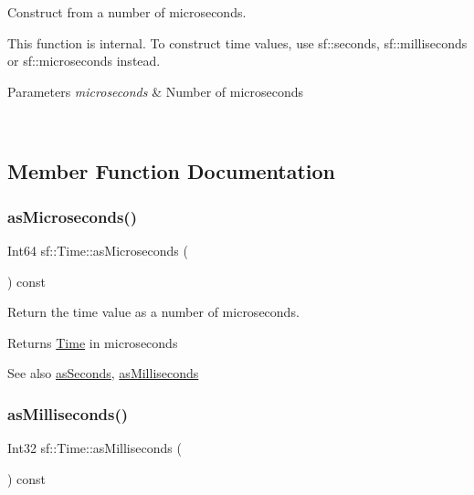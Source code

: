 Construct from a number of microseconds. 

This function is internal. To construct time values, use sf\+::seconds, sf\+::milliseconds or sf\+::microseconds instead.


\begin{DoxyParams}{Parameters}
{\em microseconds} & Number of microseconds \begin{DoxyVerb}\end{DoxyVerb}
 \\
\hline
\end{DoxyParams}


\subsection{Member Function Documentation}
\mbox{\label{classsf_1_1_time_a000c2c64b74658ebd228b9294a464275}} 
\subsubsection{\texorpdfstring{asMicroseconds()}{asMicroseconds()}}
{\footnotesize\ttfamily Int64 sf\+::\+Time\+::as\+Microseconds (\begin{DoxyParamCaption}{ }\end{DoxyParamCaption}) const}



Return the time value as a number of microseconds. 

\begin{DoxyReturn}{Returns}
\mbox{\hyperlink{classsf_1_1_time}{Time}} in microseconds
\end{DoxyReturn}
\begin{DoxySeeAlso}{See also}
\mbox{\hyperlink{classsf_1_1_time_aa3df2f992d0b0041b4eb02258d43f0e3}{as\+Seconds}}, \mbox{\hyperlink{classsf_1_1_time_aa16858ca030a07eb18958c321f256e5a}{as\+Milliseconds}} \begin{DoxyVerb}\end{DoxyVerb}
 
\end{DoxySeeAlso}
\mbox{\label{classsf_1_1_time_aa16858ca030a07eb18958c321f256e5a}} 
\subsubsection{\texorpdfstring{asMilliseconds()}{asMilliseconds()}}
{\footnotesize\ttfamily Int32 sf\+::\+Time\+::as\+Milliseconds (\begin{DoxyParamCaption}{ }\end{DoxyParamCaption}) const}



